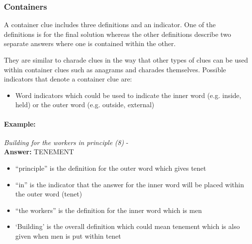 \subsubsection{Containers}

A container clue includes three definitions and an indicator. One of the
definitions is for the final solution whereas the other definitions describe two
separate answers where one is contained within the other.

They are similar to charade clues in the way that other types of clues can be
used within container clues such as anagrams and charades themselves. Possible
indicators that denote a container clue are:

\begin{itemize} 
    \item Word indicators which could be used to indicate the inner word (e.g. 
    inside, held) or the outer word (e.g. outside, external)
\end{itemize}

\paragraph{Example:} \emph{Building for the workers in principle (8)} - \citep{shuchiContainers09} \\
\textbf{Answer:} TENEMENT 

\begin{itemize}
    \item ``principle'' is the definition for the outer word which gives tenet 
    \item ``in'' is the indicator that the answer for the inner word will be 
    placed within the outer word (tenet) 
    \item ``the workers'' is the definition for the inner word which is men 
    \item `Building' is the overall definition which could mean tenement which 
    is also given when men is put within tenet 
\end{itemize}